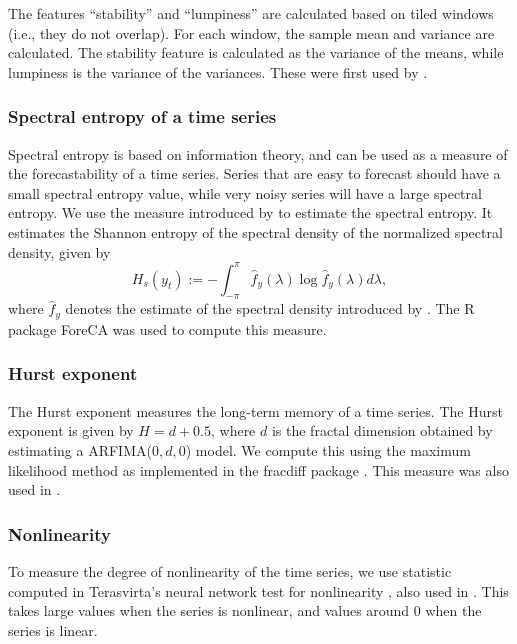 \documentclass[11pt,a4paper,]{article}
\begin{document}
The features ``stability'' and ``lumpiness'' are calculated based on
tiled windows (i.e., they do not overlap). For each window, the sample
mean and variance are calculated. The stability feature is calculated as
the variance of the means, while lumpiness is the variance of the
variances. These were first used by \textcite{hyndman2015large}.

\subsubsection*{Spectral entropy of a time
series}\label{spectral-entropy-of-a-time-series}

Spectral entropy is based on information theory, and can be used as a
measure of the forecastability of a time series. Series that are easy to
forecast should have a small spectral entropy value, while very noisy
series will have a large spectral entropy. We use the measure introduced
by \textcite{goerg2013forecastable} to estimate the spectral entropy. It
estimates the Shannon entropy of the spectral density of the normalized
spectral density, given by \[
  H_{s}(y_t):=-\int_{-\pi}^{\pi}\hat f_y(\lambda)\log \hat f_y({\lambda})d\lambda,
\] where \(\hat{f}_y\) denotes the estimate of the spectral density
introduced by \textcite{nuttall1982spectral}. The R package ForeCA
\autocite{Foreca} was used to compute this measure.

\subsubsection*{Hurst exponent}\label{hurst-exponent}

The Hurst exponent measures the long-term memory of a time series. The
Hurst exponent is given by \(H=d+0.5\), where \(d\) is the fractal
dimension obtained by estimating a ARFIMA(\(0, d, 0\)) model. We compute
this using the maximum likelihood method \autocite{haslett1989space} as
implemented in the fracdiff package \autocite{fracdiff}. This measure
was also used in \textcite{wang2009rule}.

\subsubsection*{Nonlinearity}\label{nonlinearity}

To measure the degree of nonlinearity of the time series, we use
statistic computed in Terasvirta's neural network test for nonlinearity
\autocite{nonlintest}, also used in \textcite{wang2009rule}. This takes
large values when the series is nonlinear, and values around 0 when the
series is linear.
\end{document}
